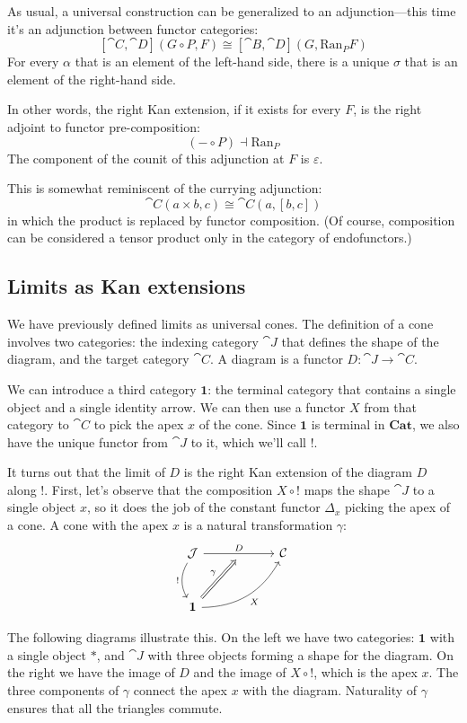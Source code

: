 \documentclass[DaoFP]{subfiles}
\begin{document}
As usual, a universal construction can be generalized to an adjunction---this time it's an adjunction between functor categories:
\[ [\cat C, \cat D](G \circ P, F) \cong [\cat B, \cat D](G, \text{Ran}_P F) \]
For every $\alpha$ that is an element of the left-hand side, there is a unique $\sigma$ that is an element of the right-hand side.

In other words, the right Kan extension, if it exists for every $F$, is the right adjoint to functor pre-composition:
\[ (- \circ P) \dashv \text{Ran}_P \]
The component of the counit of this adjunction at $F$ is $\varepsilon$.

This is somewhat reminiscent of the currying adjunction:
\[ \cat C (a \times b, c) \cong \cat C (a, [b, c]) \]
in which the product is replaced by functor composition. (Of course, composition can be considered a tensor product only in the category of endofunctors.)

\subsection{Limits as Kan extensions}
 We have previously defined limits as universal cones. The definition of a cone involves two categories: the indexing category $\cat J$ that defines the shape of the diagram, and the target category $\cat C$. A diagram is a functor $D \colon \cat J \to \cat C$. 
 
 We can introduce a third category $\mathbf 1$: the terminal category that contains a single object and a single identity arrow. We can then use a functor $X$ from that category to $\cat C$ to pick the apex $x$ of the cone. Since $\mathbf 1$ is terminal in $\mathbf{Cat}$, we also have the unique functor from $\cat J$ to it, which we'll call $!$.
 
It turns out that the limit of $D$ is the right Kan extension of the diagram $D$ along $!$. First, let's observe that the composition $X \circ !$ maps the shape $\cat J$ to a single object $x$, so it does the job of the constant functor $\Delta_x$ picking the apex of a cone. A cone with the apex $x$ is a natural transformation $\gamma$: 
\[
 \begin{tikzcd} [row sep=1cm, column sep=1cm]
 \cat J
 \arrow[rr, "D", "" {name=ID, below} ]
 \arrow[d, bend right, "!"']
 && \cat C
 \\
 \mathbf 1
  \arrow[urr, bend right, "X"']
 \arrow[Rightarrow, "\gamma",  to=ID]
 \end{tikzcd}
\]

The following diagrams illustrate this. On the left we have two categories: $\mathbf 1$ with a single object $*$, and $\cat J$ with three objects forming a shape for the diagram. On the right we have the image of $D$ and the image of $X \circ !$, which is the apex $x$. The three components of $\gamma$ connect the apex $x$ with the diagram. Naturality of $\gamma$ ensures that all the triangles commute.
\end{document}
